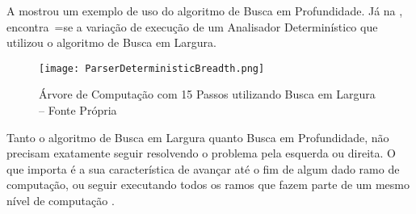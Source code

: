 A  mostrou um exemplo de uso do algoritmo de Busca em Profundidade.
Já na ,
encontra~=se a variação de execução de um Analisador Determinístico que utilizou o algoritmo de Busca em Largura.
\begin{figure}[h]
\centering
\texttt{[image: ParserDeterministicBreadth.png]}
\caption[Árvore de Computação com 15 Passos utilizando Busca em Largura]{Árvore de Computação com 15 Passos utilizando Busca em Largura -- Fonte Própria}
\label{ParserDeterministicBreadth}
\end{figure}

Tanto o algoritmo de Busca em Largura quanto Busca em Profundidade,
não precisam exatamente seguir resolvendo o problema pela esquerda ou
direita.
O que importa é a sua característica de avançar até o fim de algum dado ramo de computação,
ou seguir executando todos os ramos que fazem parte de um mesmo nível de computação \cite{cormenIntroductionToAlgorithms,efficientBreadthFirstSearch}.

